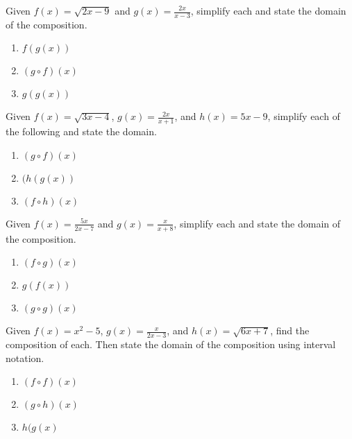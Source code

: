 Given $f(x) = \sqrt{2x-9}$ and $g(x) = \frac{2x}{x-3}$, simplify each and state the domain of the composition.

\begin{multicols}{3}
\begin{enumerate}	\setcounter{enumi}{\value{Review}}  
    \item $f(g(x))$
    \item $(g \circ f)(x)$
    \item $g(g(x))$
\end{enumerate}		\setcounter{Review}{\value{enumi}}
\end{multicols}

Given $f(x) = \sqrt{3x-4}$, $g(x) = \frac{2x}{x+1}$, and $h(x) = 5x-9$, simplify each of the following and state the domain.
\begin{multicols}{3}
\begin{enumerate}   \setcounter{enumi}{\value{Review}}
    \item $(g \circ f)(x)$
    \item $(h(g(x))$
    \item $(f \circ h)(x)$
\end{enumerate}     \setcounter{Review}{\value{enumi}}
\end{multicols}

Given $f(x) = \frac{5x}{2x-7}$ and $g(x) = \frac{x}{x+8}$, simplify each and state the domain of the composition.
\begin{multicols}{3}
\begin{enumerate}   \setcounter{enumi}{\value{Review}}
\item $(f \circ g)(x)$
\item  $g(f(x))$
\item  $(g \circ g)(x)$
\end{enumerate}     \setcounter{Review}{\value{enumi}}
\end{multicols}

Given $f(x) = x^2 - 5$, $g(x) = \frac{x}{2x-3}$, and $h(x) = \sqrt{6x+7}$, find the composition of each. Then state the domain of the composition using interval notation.
\begin{multicols}{3}
\begin{enumerate}   \setcounter{enumi}{\value{Review}}
\item $(f \circ f)(x)$
\item $(g \circ h)(x)$
\item $h(g(x)$
\end{enumerate}     \setcounter{Review}{\value{enumi}}	
\end{multicols}

